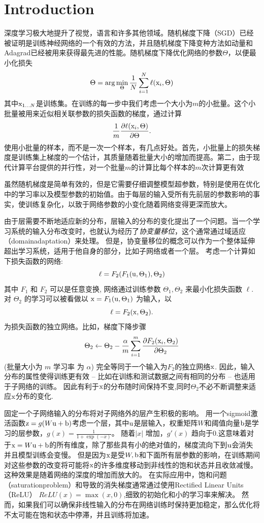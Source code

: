 \documentclass[twocolumn]{article}
\begin{document}
\section{Introduction}

深度学习极大地提升了视觉，语言和许多其他领域。随机梯度下降（SGD）已经被证明是训练神经网络的一个有效的方法，并且随机梯度下降变种方法如动量\cite{momentum}和Adagrad\cite{momentum}已经被用来获得最先进的性能。随机梯度下降优化网络的参数$\Theta$，以便最小化损失
$$\Theta = \arg \min_\Theta
\frac{1}{N}\sum_{i=1}^N \ell(\mathrm{x}_i, \Theta)$$
其中$\mathrm{x}_{1\ldots N}$是训练集。在训练的每一步中我们考虑一个大小为$m$的小批量。这个小批量被用来近似相关联参数的损失函数的梯度，通过计算
$$\frac{1}{m} \frac{\partial  \ell(\mathrm{x}_i, \Theta)}{\partial  \Theta}.$$
使用小批量的样本，而不是一次一个样本，有几点好处。首先，小批量上的损失梯度是训练集上梯度的一个估计，其质量随着批量大小的增加而提高。第二，由于现代计算平台提供的并行性，对一个批量$m$的计算比每个样本的$m$次计算更有效

虽然随机梯度是简单有效的，但是它需要仔细调整模型超参数，特别是使用在优化中的学习率以及模型参数的初始值。由于每层的输入受所有先前层的参数影响的事实，使训练复杂化，以致于网络参数的小变化随着网络变得更深而放大。

由于层需要不断地适应新的分布，层输入的分布的变化提出了一个问题。当一个学习系统的输入分布改变时，也就认为经历了{\em 协变量移位}\cite{covariate-shift}，这个通常通过域适应（domainadaptation）\cite{domain-adaptation-survey}来处理。
但是，协变量移位的概念可以作为一个整体延伸超出学习系统，适用于他自身的部分，比如子网络或者一个层。
考虑一个计算如下损失函数的网络:$$\ell = F_2(F_1(\mathrm{u}, \Theta_1), \Theta_2)$$ 其中
$F_1$ 和 $F_2$ 可以是任意变换, 网络通过训练参数
$\Theta_1, \Theta_2$ 来最小化损失函数 $\ell$.
对 $\Theta_2$ 的学习可以被看做以
$\mathrm{x}=F_1(\mathrm{u},\Theta_1)$ 为输入，以
$$\ell = F_2(\mathrm{x}, \Theta_2).$$ 为损失函数的独立网络。比如，梯度下降步骤
$$\Theta_2\leftarrow \Theta_2 - \frac{\alpha}{m}\sum_{i=1}^m
\frac{\partial F_2(\mathrm{x}_i,\Theta_2)}{\partial \Theta_2}$$ (批量大小为 $m$ 学习率
为 $\alpha$) 完全等同于一个输入为$F_2$的独立网络$\mathrm{x}$.  
因此，输入分布的属性使得训练更有效 -- 比如在训练和测试数据之间有相同的分布 -- 也适用于子网络的训练。
因此有利于$\mathrm{x}$的分布随时间保持不变,同时$\Theta_2$不必不断调整来适应$\mathrm{x}$分布的变化.

固定一个子网络输入的分布将对子网络外的层产生积极的影响。
用一个sigmoid激活函数$\mathrm{z} = g(W\mathrm{u}+\mathrm{b})$考虑一个层，其中$\mathrm{u}$是层输入，权重矩阵$W$和阈值向量$\mathrm{b}$是学习的层参数，$g(x) = \frac{1}{1+\exp(-x)}$。
随着$|x|$ 增加，$g'(x)$ 趋向于0.这意味着对于$\mathrm{x}=W\mathrm{u}+\mathrm{b}$的所有维度，除了那些具有小的绝对值的，梯度流向下到$\mathrm{u}$会消失并且模型训练会变慢。
但是因为$\mathrm{x}$是受$W, \mathrm{b}$和下面所有层参数的影响，在训练期间对这些参数的改变将可能将$\mathrm{x}$的许多维度移动到非线性的饱和状态并且收敛减慢。
这种效果是随着网络的深度的增加而放大的。
在实际应用中，饱和问题（saturationproblem）和导致的消失梯度通常通过使用Rectified Linear Units（ReLU）\cite{relu} $ReLU(x)=\max(x,0)$,细致的初始化\cite{glorot-difficulty,iclr-dynamics}和小的学习率来解决。
然而，如果我们可以确保非线性输入的分布在网络训练时保持更加稳定，那么优化将不太可能在饱和状态中停滞，并且训练将加速。
\end{document}

